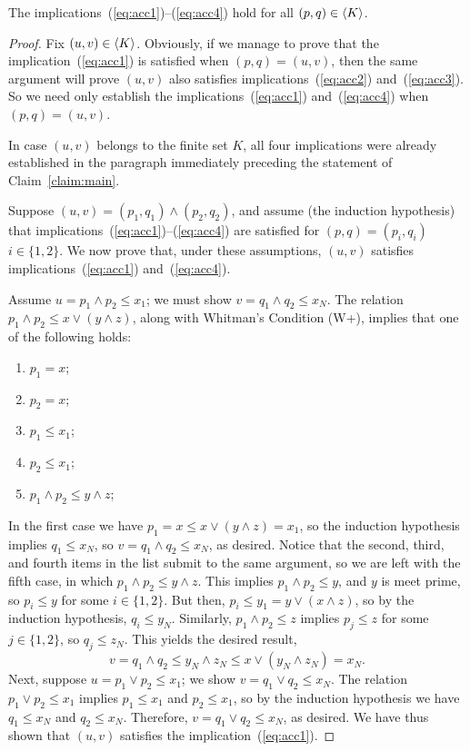 \begin{claim}\label{claim:main}
  The implications~(\ref{eq:acc1})--(\ref{eq:acc4}) hold for all $(p,q) \in \langle K\rangle$.
\end{claim}
\begin{proof}
Fix $(u, v) \in  \langle K\rangle$. Obviously, if we manage to prove that the implication~(\ref{eq:acc1}) is satisfied when $(p,q) = (u,v)$, then the same argument will prove $(u,v)$ also satisfies implications~(\ref{eq:acc2}) and~(\ref{eq:acc3}).  So we need only establish the implications~(\ref{eq:acc1}) and~(\ref{eq:acc4}) when $(p,q) = (u,v)$.

In case $(u,v)$ belongs to the finite set $K$, all four implications were already established in the paragraph immediately preceding the statement of Claim~\ref{claim:main}.

Suppose $(u,v) = (p_1, q_1) \wedge (p_2, q_2)$, and assume (the induction hypothesis) that implications~(\ref{eq:acc1})--(\ref{eq:acc4}) are satisfied 
for $(p,q) = (p_i,q_i)$ $i\in \{1,2\}$.
We now prove that, under these assumptions, $(u,v)$ satisfies implications~(\ref{eq:acc1})
and~(\ref{eq:acc4}).

Assume $u = p_1\wedge p_2 \leq x_1$; we must show $v=q_1\wedge q_2 \leq x_N$.
The relation $p_1\wedge p_2 \leq x\vee (y \wedge z)$, along with Whitman's Condition (W+), implies that one of the following holds:
\begin{enumerate}
  \item   $p_1=x$;  
  \item   $p_2=x$;  
  \item   $p_1\leq x_1$;  
  \item   $p_2\leq x_1$;  
  \item   $p_1\wedge p_2 \leq y \wedge z$;  
\end{enumerate}
In the first case we have $p_1 = x \leq x \vee (y \wedge z) = x_1$, so
the induction hypothesis implies $q_1\leq x_N$, so $v = q_1\wedge q_2\leq x_N$, as desired.  Notice that the second, third, and fourth items in the list submit to the same argument, so we are left with the fifth case, 
in which $p_1\wedge p_2 \leq y \wedge z$. 
This implies $p_1\wedge p_2 \leq y$, and $y$ is meet prime, so 
$p_i\leq y$ for some $i\in \{1,2\}$.  But then, $p_i \leq y_1 = y\vee (x\wedge z)$, so by the induction hypothesis, $q_i \leq y_N$.
Similarly, $p_1\wedge p_2 \leq z$ implies 
$p_j\leq z$ for some $j\in \{1,2\}$, so $q_j \leq z_N$.
This yields the desired result,
\[
v = q_1\wedge q_2 \leq y_N \wedge z_N \leq x \vee (y_N\wedge z_N) = x_N.
\] 
Next, suppose $u = p_1\vee p_2 \leq x_1$; we show $v = q_1 \vee q_2 \leq x_N$. The relation $p_1\vee p_2 \leq x_1$ implies $p_1\leq x_1$ and 
$p_2\leq x_1$, so by the induction hypothesis we have 
$q_1\leq x_N$ and 
$q_2\leq x_N$.  Therefore, $v = q_1 \vee q_2 \leq x_N$, as desired.
We have thus shown that $(u,v)$ satisfies the implication~(\ref{eq:acc1}).


\end{proof}
